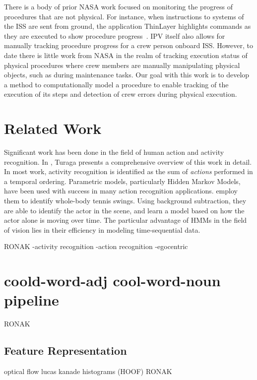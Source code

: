 \documentclass[10pt,twocolumn,letterpaper]{article}
\begin{document}
There is a body of prior NASA work focused on monitoring the progress of procedures that are not physical. For instance, when instructions to systems of the ISS are sent from ground, the application ThinLayer highlights commands as they are executed to show procedure progress~\cite{frank2010plans}. IPV itself also allows for manually tracking procedure progress for a crew person onboard ISS. However, to date there is little work from NASA in the realm of tracking execution status of physical procedures where crew members are manually manipulating physical objects, such as during maintenance tasks. Our goal with this work is to develop a method to computationally model a procedure to enable tracking of the execution of its steps and detection of crew errors during physical execution.


\section{Related Work}

Significant work has been done in the field of human action and activity recognition. In \cite{turaga2008machine}, Turaga presents a comprehensive overview of this work in detail. In most work, activity recognition is identified as the sum of \emph{actions} performed in a temporal ordering. Parametric models, particularly Hidden Markov Models, have been used with success in many action recognition applications. \cite{yamato1992recognizing} employ them to identify whole-body tennis swings. Using background subtraction, they are able to identify the actor in the scene, and learn a model based on how the actor alone is moving over time. The particular advantage of HMMs in the field of vision lies in their efficiency in modeling time-sequential data.


RONAK
-activity recognition
-action recognition
-egocentric


\section{coold-word-adj cool-word-noun pipeline}
RONAK

\subsection{Feature Representation}
optical flow lucas kanade
histograms (HOOF)
RONAK
\end{document}
